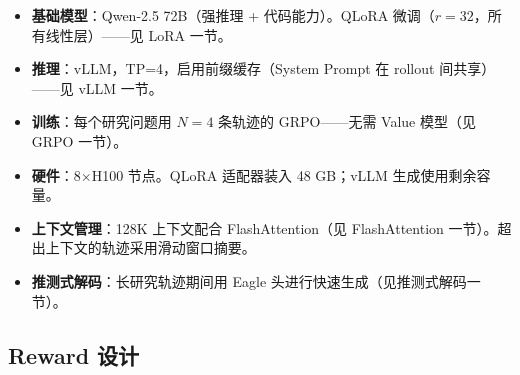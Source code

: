 \begin{keybox}
\begin{itemize}
  \item \textbf{基础模型}：Qwen-2.5 72B（强推理 + 代码能力）。QLoRA 微调（$r=32$，所有线性层）——见 LoRA 一节。
  \item \textbf{推理}：vLLM，TP=4，启用前缀缓存（System Prompt 在 rollout 间共享）——见 vLLM 一节。
  \item \textbf{训练}：每个研究问题用 $N=4$ 条轨迹的 GRPO——无需 Value 模型（见 GRPO 一节）。
  \item \textbf{硬件}：8$\times$H100 节点。QLoRA 适配器装入 48 GB；vLLM 生成使用剩余容量。
  \item \textbf{上下文管理}：128K 上下文配合 FlashAttention（见 FlashAttention 一节）。超出上下文的轨迹采用滑动窗口摘要。
  \item \textbf{推测式解码}：长研究轨迹期间用 Eagle 头进行快速生成（见推测式解码一节）。
\end{itemize}
\end{keybox}

\subsection{Reward 设计}
\label{reward-design}

